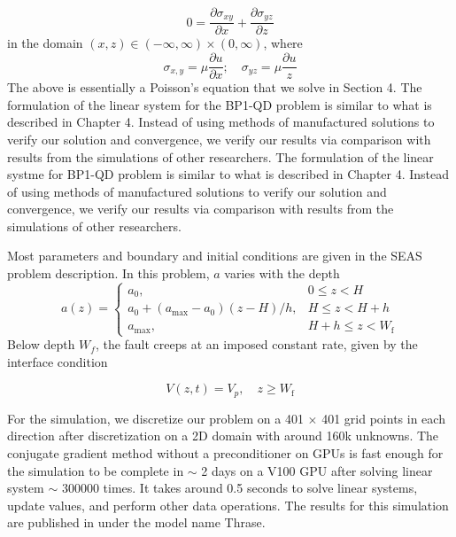 \begin{equation}
    0 = \frac{\partial \sigma_{xy}}{\partial x} + \frac{\partial \sigma_{yz}}{\partial z}
\end{equation}
in the domain $(x,z) \in (-\infty, \infty) \times (0,\infty)$, where
\begin{equation}
    \sigma_{x,y} = \mu \frac{\partial u}{\partial x}; \quad \sigma_{yz} = \mu \frac{\partial u}{z}
\end{equation}
The above is essentially a Poisson's equation that we solve in Section 4.
The formulation of the linear system for the BP1-QD problem is similar to what is described in Chapter 4.
Instead of using methods of manufactured solutions to verify our solution and convergence, we verify our results via comparison with results from the simulations of other researchers.
The formulation of the linear systme for BP1-QD problem is similar to what is described in Chapter 4.
Instead of using methods of manufactured solutions to verify our solution and convergence, we verify our results via comparison with results from the simulations of other researchers.

Most parameters and boundary and initial conditions are given in the SEAS problem description. In this problem, $a$ varies with the depth
\begin{equation}
a(z) = 
\begin{cases} 
a_0, & 0 \leq z < H \\
a_0 + (a_{\text{max}} - a_0)(z - H)/h, & H \leq z < H + h \\
a_{\text{max}}, & H + h \leq z < W_\text{f} 
\end{cases}
\end{equation}
Below depth $W_f$, the fault creeps at an imposed constant rate, given by the interface condition

\begin{equation}
    V(z,t) = V_p, \quad z \geq W_\text{f}
\end{equation}

For the simulation, we discretize our problem on a 401 $\times$ 401 grid points in each direction after discretization on a 2D domain with around 160k unknowns. 
The conjugate gradient method without a preconditioner on GPUs is fast enough for the simulation to be complete in $\sim$ 2 days on a V100 GPU after solving linear system $\sim$ 300000 times.
It takes around 0.5 seconds to solve linear systems, update values, and perform other data operations.
The results for this simulation are published in \citep{erickson2023incorporating} under the model name Thrase.


